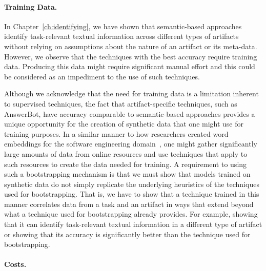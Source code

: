 \paragraph{\textbf{Training Data.}}


In Chapter~\ref{ch:identifying}, we have shown that semantic-based approaches identify task-relevant textual information across
different types of artifacts without relying on
assumptions about the nature of an artifact or its meta-data.
However, we
observe that the techniques with the best accuracy require training data. Producing this
 data might require significant manual effort and this could be considered as an impediment to the use of such  techniques. 



Although we acknowledge that the need for training data is a limitation inherent to supervised techniques,
the fact that artifact-specific techniques, such as AnswerBot, have accuracy comparable to semantic-based approaches
 provides
a unique opportunity for the creation of synthetic data that one might use for training purposes.
In a similar manner to how researchers created word embeddings for the software engineering domain~\cite{Efstathiou2018}, one might gather significantly large amounts of data from online resources
and use techniques that apply to such resources to create the data needed for training.
A requirement to using such a bootstrapping mechanism is that we must show that models trained on synthetic data do not simply replicate the underlying heuristics of the techniques used for bootstrapping. That is, we have to show that a technique trained
in this manner correlates data from a task and an artifact in ways that
extend beyond what a technique used for bootstrapping already provides. For example, showing that
it can identify task-relevant textual information in a different type of artifact or showing
that its accuracy is significantly better than the technique used for bootstrapping.



\paragraph{\textbf{Costs.}}


